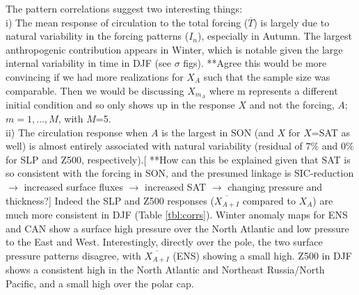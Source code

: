 \documentclass[12pt]{article}
\begin{document}
The pattern correlations suggest two interesting things:\\
i) The mean response of circulation to the total forcing ($\overline{T}$) is largely due to natural variability in the forcing patterns ($I_n$), especially in Autumn. The largest anthropogenic contribution appears in Winter, which is notable given the large internal variability in time in DJF (see $\sigma$ figs). **Agree this would be more convincing if we had more realizations for $X_A$ such that the sample size was comparable. Then we would be discussing $X_{m_A}$ where m represents a different initial condition and so only shows up in the response $X$ and not the forcing, $A$; $m=1,\ldots,M$, with $M$=5.\\
ii) The circulation response when $A$ is the largest in SON (and $X$ for $X$=SAT as well) is almost entirely associated with natural variability (residual of $7\%$ and $0\%$ for SLP and Z500, respectively).[ **How can this be explained given that SAT is so consistent with the forcing in SON, and the presumed linkage is SIC-reduction $\to$ increased surface fluxes $\to$ increased SAT $\to$ changing pressure and thickness?] Indeed the SLP and Z500 responses ($\overline{X_{A+I}}$ compared to $X_A$) are much more consistent in DJF (Table \ref{tbl:corrs}). Winter anomaly maps for ENS and CAN show a surface high pressure over the North Atlantic and low pressure to the East and West. Interestingly, directly over the pole, the two surface pressure patterns disagree, with $\overline{X_{A+I}}$ (ENS) showing a small high. Z500 in DJF shows a consistent high in the North Atlantic and Northeast Russia/North Pacific, and a small high over the polar cap.
\end{document}

